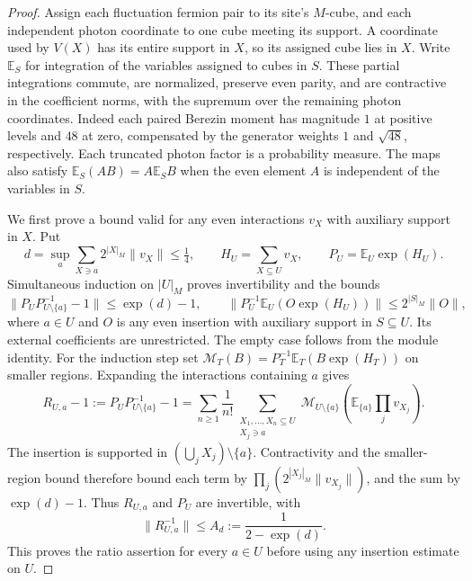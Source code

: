 \begin{proof}
Assign each fluctuation fermion pair to its site's $M$-cube,
and each independent photon coordinate to one cube meeting its support.
A coordinate used by $V(X)$ has its entire support in $X$,
so its assigned cube lies in $X$. Write $\mathbb E_S$ for
integration of the variables assigned to cubes in $S$.
These partial integrations commute, are normalized, preserve even
parity, and are contractive in the coefficient norms, with the
supremum over the remaining photon coordinates. Indeed each paired
Berezin moment has magnitude $1$ at positive levels and $48$ at zero,
compensated by the generator weights $1$ and $\sqrt{48}$,
respectively. Each truncated photon factor is a probability measure.
The maps also satisfy
$\mathbb E_S(AB)=A\mathbb E_SB$ when the even element $A$
is independent of the variables in $S$.

We first prove a bound valid for any even interactions $v_X$
with auxiliary support in $X$. Put
\[
 d=\sup_a\sum_{X\ni a}2^{|X|_M}\|v_X\|\le\tfrac14,\qquad
 H_U=\sum_{X\subseteq U}v_X,\qquad P_U=\mathbb E_U\exp(H_U).
\]
Simultaneous induction on $|U|_M$ proves invertibility and the bounds
\[
 \|P_UP_{U\setminus\{a\}}^{-1}-1\|\le \exp(d)-1,\qquad
 \|P_U^{-1}\mathbb E_U(O\exp(H_U))\|\le2^{|S|_M}\|O\|,
\]
where $a\in U$ and $O$ is any even insertion with auxiliary
support in $S\subseteq U$. Its external coefficients are unrestricted.
The empty case follows from the module identity. For the induction
step set $\mathcal M_T(B)=P_T^{-1}\mathbb E_T(B\exp(H_T))$
on smaller regions. Expanding the interactions containing $a$ gives
\[
 R_{U,a}-1:=P_UP_{U\setminus\{a\}}^{-1}-1
 =\sum_{n\ge1}\frac1{n!}
   \sum_{\substack{X_1,\ldots,X_n\subseteq U\\X_j\ni a}}
   \mathcal M_{U\setminus\{a\}}
           \left(\mathbb E_{\{a\}}\prod_jv_{X_j}\right).
\]
The insertion is supported in $(\bigcup_jX_j)\setminus\{a\}$.
Contractivity and the smaller-region bound therefore bound each
term by $\prod_j(2^{|X_j|_M}\|v_{X_j}\|)$, and the sum by
$\exp(d)-1$. Thus $R_{U,a}$ and $P_U$ are invertible, with
\[
 \|R_{U,a}^{-1}\|\le A_d:=\frac1{2-\exp(d)}.
\]
This proves the ratio assertion for every $a\in U$ before using
any insertion estimate on $U$.


\end{proof}
